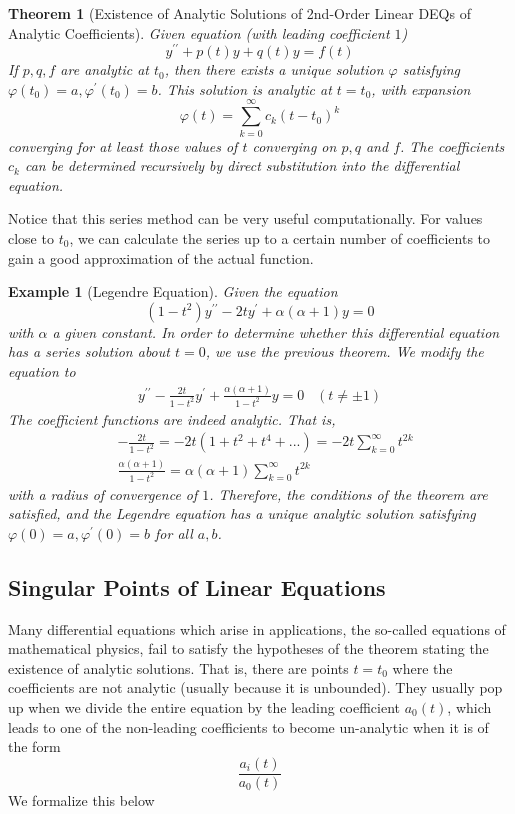 \documentclass{article}
\newtheorem{theorem}{Theorem}[section]
\newtheorem{example}{Example}[section]
\theoremstyle{remark}
\theoremstyle{definition}
\begin{document}
\begin{theorem}[Existence of Analytic Solutions of 2nd-Order Linear DEQs of Analytic Coefficients]
Given equation (with leading coefficient $1$)
\[y^{\prime\prime} + p(t) y + q(t) y = f(t)\]
If $p, q, f$ are analytic at $t_0$, then there exists a unique solution $\varphi$ satisfying $\varphi (t_0) = a, \varphi^\prime (t_0) = b$. This solution is analytic at $t = t_0$, with expansion
\[\varphi(t) = \sum_{k=0}^\infty c_k (t-t_0)^k\]
converging for at least those values of $t$ converging on $p, q$ and $f$. The coefficients $c_k$ can be determined recursively by direct substitution into the differential equation. 
\end{theorem}

Notice that this series method can be very useful computationally. For values close to $t_0$, we can calculate the series up to a certain number of coefficients to gain a good approximation of the actual function. 

\begin{example}[Legendre Equation]
Given the equation
\[(1 - t^2) y^{\prime \prime} - 2 t y^\prime + \alpha (\alpha + 1) y = 0\]
with $\alpha$ a given constant. In order to determine whether this differential equation has a series solution about $t=0$, we use the previous theorem. We modify the equation to
\begin{align*}
    y^{\prime\prime} - \frac{2 t}{1 - t^2} y^\prime + \frac{\alpha (\alpha + 1)}{1 - t^2} y = 0 \;\;\; (t \neq \pm 1) 
\end{align*}
The coefficient functions are indeed analytic. That is, 
\begin{align*}
    & - \frac{2t}{1 - t^2} = -2 t (1 + t^2 + t^4 + ... ) = -2t \sum_{k=0}^\infty t^{2k} \\
    & \frac{\alpha(\alpha+1)}{1 - t^2} = \alpha (\alpha + 1) \sum_{k=0}^\infty t^{2k}
\end{align*}
with a radius of convergence of $1$. Therefore, the conditions of the theorem are satisfied, and the Legendre equation has a unique analytic solution satisfying $\varphi(0) = a, \varphi^\prime (0) = b$ for all $a, b$. 
\end{example}

\subsection{Singular Points of Linear Equations}
Many differential equations which arise in applications, the so-called equations of mathematical physics, fail to satisfy the hypotheses of the theorem stating the existence of analytic solutions. That is, there are points $t = t_0$ where the coefficients are not analytic (usually because it is unbounded). They usually pop up when we divide the entire equation by the leading coefficient $a_0 (t)$, which leads to one of the non-leading coefficients to become un-analytic when it is of the form 
\[\frac{a_i(t)}{a_0 (t)} \]
We formalize this below 
\end{document}
